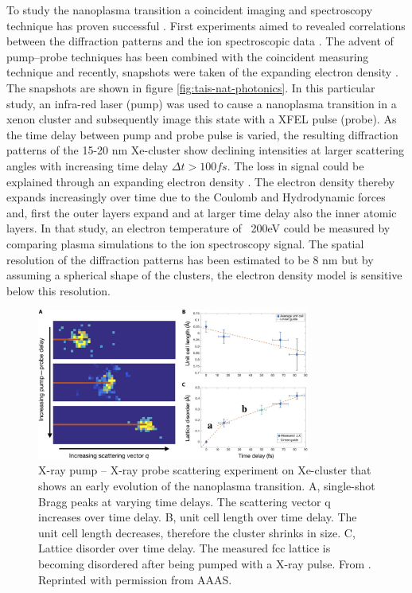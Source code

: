 To study the nanoplasma transition a coincident imaging and spectroscopy technique has proven successful \citep{Bostedt-2012-PRL}. First experiments aimed to revealed correlations between the diffraction patterns and the ion spectroscopic data \citep{Gorkhover-2012-PRL,Rupp-2016-PRL}. The advent of pump--probe techniques has been combined with the coincident measuring technique and recently, snapshots were taken of the expanding electron density \citep{Gorkhover-2016-NatPho}. The snapshots are shown in figure \ref{fig:tais-nat-photonics}. In this particular study, an infra-red laser (pump) was used to cause a nanoplasma transition in a xenon cluster and subsequently image this state with a XFEL pulse (probe). As the time delay between pump and probe pulse is varied, the resulting diffraction patterns of the 15-20 nm Xe-cluster show declining intensities at larger scattering angles with increasing time delay $\Delta t>100 fs$. The loss in signal could be explained through an expanding electron density \citep{Hau-Riege-2008-PRE,Peltz-2014-PRL}. The electron density thereby expands increasingly over time due to the Coulomb and Hydrodynamic forces and, first the outer layers expand and at larger time delay also the inner atomic layers. In that study, an electron temperature of ~200eV could be measured by comparing plasma simulations to the ion spectroscopy signal. The spatial resolution of the diffraction patterns has been estimated to be 8 nm but by assuming a spherical shape of the clusters, the electron density model is sensitive below this resolution.\\
\begin{figure}
	\centering
		\includegraphics[width=0.80\textwidth]{images/ken-science.jpg}
	\caption[Experiment that shows early evolution of the nanoplasma transition.]{X-ray pump -- X-ray probe scattering experiment on Xe-cluster that shows an early evolution of the nanoplasma transition. A, single-shot Bragg peaks at varying time delays. The scattering vector q increases over time delay. B, unit cell length over time delay. The unit cell length decreases, therefore the cluster shrinks in size. C, Lattice disorder over time delay. The measured fcc lattice is becoming disordered after being pumped with a X-ray pulse. From \citep{Ferguson-2016-SciAdv}. Reprinted with permission from AAAS.}
	\label{fig:ken-science}
\end{figure}
